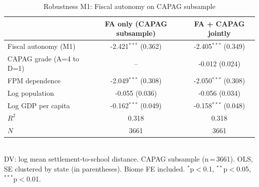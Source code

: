 \begin{table}[h]
\centering
\caption{Robustness M1: Fiscal autonomy on CAPAG subsample}
\begin{tabular}{lcc}
\toprule
& FA only (CAPAG subsample) & FA + CAPAG jointly \\
\midrule
Fiscal autonomy (M1) & -2.421$^{***}$ (0.362) & -2.405$^{***}$ (0.349) \\
CAPAG grade (A=4 to D=1) & -- & -0.012 (0.024) \\
FPM dependence & -2.049$^{***}$ (0.308) & -2.050$^{***}$ (0.308) \\
Log population & -0.055 (0.036) & -0.056 (0.034) \\
Log GDP per capita & -0.162$^{***}$ (0.049) & -0.158$^{***}$ (0.048) \\
\midrule
$R^2$ & 0.318 & 0.318 \\
$N$ & 3661 & 3661 \\
\bottomrule
\end{tabular}
\\[4pt]
\footnotesize{DV: log mean settlement-to-school distance. CAPAG subsample (n\,=\,3661). OLS, SE clustered by state (in parentheses). Biome FE included. $^{*}$p$<$0.1, $^{**}$p$<$0.05, $^{***}$p$<$0.01.}
\end{table}
